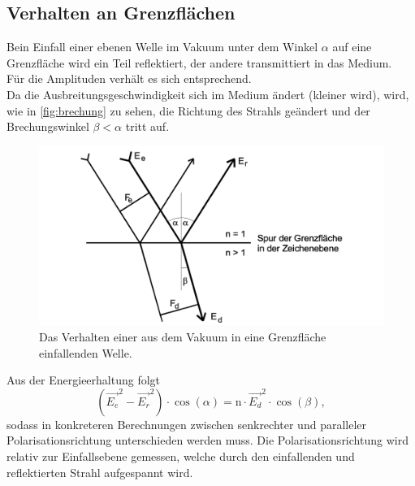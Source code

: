  \subsection{Verhalten an Grenzflächen}
Bein Einfall einer ebenen Welle im Vakuum unter dem Winkel $\alpha$ auf eine Grenzfläche 
wird ein Teil reflektiert, der andere transmittiert in das Medium. \\
Für die Amplituden verhält es sich entsprechend.\\
Da die Ausbreitungsgeschwindigkeit sich im Medium ändert (kleiner wird), wird, wie in \autoref{fig:brechung} zu sehen,  die 
Richtung des Strahls geändert und der Brechungswinkel $\beta < \alpha$ tritt auf.\\
\begin{figure} [H]
    \centering
    \includegraphics{content/brechung}
    \caption{Das Verhalten einer aus dem Vakuum in eine Grenzfläche einfallenden Welle. \cite{sample}}
    \label{fig:brechung}
  \end{figure}
Aus der Energieerhaltung folgt 
\begin{equation*}
    (\vec{E_e}^2 - \vec{E_r}^2)  \cdot \cos(\alpha) =  \mathrm{n} \cdot \vec{E_d}^2 \cdot \cos(\beta),
\end{equation*}
sodass in konkreteren Berechnungen zwischen senkrechter und paralleler Polarisationsrichtung 
unterschieden werden muss.
Die Polarisationsrichtung wird relativ zur Einfallsebene gemessen, welche durch den einfallenden 
und reflektierten Strahl aufgespannt wird. \\ 


